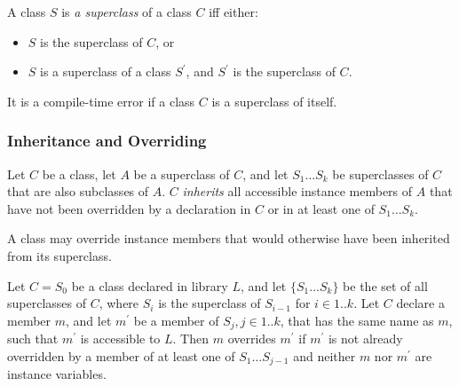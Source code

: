 \documentclass{article}
\begin{document}
\LMHash{}
A class $S$ is {\em a superclass} of a class $C$ if{}f either:
\begin{itemize}
\item $S$ is the superclass of $C$, or
\item $S$ is a superclass of a class $S^{\prime}$,
and $S^{\prime}$ is the superclass of $C$.
\end{itemize}

\LMHash{}
It is a compile-time error if a class $C$ is a superclass of itself.


\subsubsection{Inheritance and Overriding}


\LMHash{}
Let $C$ be a class, let $A$ be a superclass of $C$, and let $S_1 \ldots S_k$ be superclasses of $C$ that are also subclasses of $A$.
$C$ {\em inherits} all accessible instance members of $A$ that have not been overridden by a declaration in $C$ or in at least one of $S_1 \ldots S_k$.


\LMHash{}
A class may override instance members that would otherwise have been inherited from its superclass.

\LMHash{}
Let $C = S_0$ be a class declared in library $L$, and let $\{S_1 \ldots S_k\}$ be the set of all superclasses of $C$, where $S_i$ is the superclass of $S_{i-1}$ for $i \in 1 .. k$.
Let $C$ declare a member $m$, and let $m^\prime$ be a member of $S_j, j \in 1 .. k$, that has the same name as $m$, such that $m^\prime$ is accessible to $L$.
Then $m$ overrides $m^\prime$ if $m^\prime$ is not already overridden by a member of at least one of $S_1 \ldots S_{j-1}$ and neither $m$ nor $m^\prime$ are instance variables.

\end{document}

